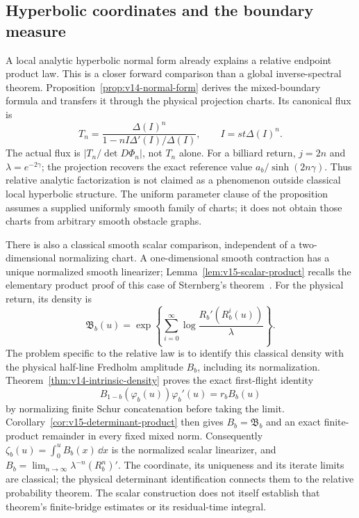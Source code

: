 \subsection{Hyperbolic coordinates and the boundary measure}
\label{sec:v14-forward-position}
A local analytic hyperbolic normal form already explains a relative
endpoint product law. This is a closer forward comparison than a global
inverse-spectral theorem. Proposition~\ref{prop:v14-normal-form} derives
the mixed-boundary formula and transfers it through the physical
projection charts. Its canonical flux is
\[
 T_n=\frac{\Delta(I)^n}{1-nI\Delta'(I)/\Delta(I)},
 \qquad I=st\Delta(I)^n.
\]
The actual flux is $|T_n/\det D\Phi_n|$, not $T_n$ alone. For a
billiard return, $j=2n$ and $\lambda=e^{-2\gamma}$; the projection
recovers the exact reference value $a_b/\sinh(2n\gamma)$. Thus
relative analytic factorization is not claimed as a phenomenon outside
classical local hyperbolic structure. The uniform parameter clause of
the proposition assumes a supplied uniformly smooth family of charts;
it does not obtain those charts from arbitrary smooth obstacle graphs.

There is also a classical smooth scalar comparison, independent of a
two-dimensional normalizing chart. A one-dimensional smooth contraction
has a unique normalized smooth linearizer; Lemma~\ref{lem:v15-scalar-product}
recalls the elementary product proof of this case of Sternberg's
theorem~\cite{Sternberg,EN}. For the physical return, its density is
\[
 \mathfrak B_b(u)=\exp\!\left\{
   \sum_{i=0}^{\infty}\log\frac{R_b'(R_b^i(u))}{\lambda}\right\}.
\]
The problem specific to the relative law is to identify this classical
density with the physical half-line Fredholm amplitude $B_b$, including
its normalization. Theorem~\ref{thm:v14-intrinsic-density} proves the
exact first-flight identity
\[
 B_{1-b}(\varphi_b(u))\varphi_b'(u)=r_b B_b(u)
\]
by normalizing finite Schur concatenation before taking the limit.
Corollary~\ref{cor:v15-determinant-product} then gives $B_b=\mathfrak B_b$
and an exact finite-product remainder in every fixed mixed norm.
Consequently $\zeta_b(u)=\int_0^uB_b(x)\,\dd x$ is the normalized
scalar linearizer, and $B_b=\lim_{n\to\infty}\lambda^{-n}(R_b^n)'$.
The coordinate, its uniqueness and its iterate limits are classical;
the physical determinant identification connects them to the relative
probability theorem. The scalar construction does not itself establish
that theorem's finite-bridge estimates or its residual-time integral.

